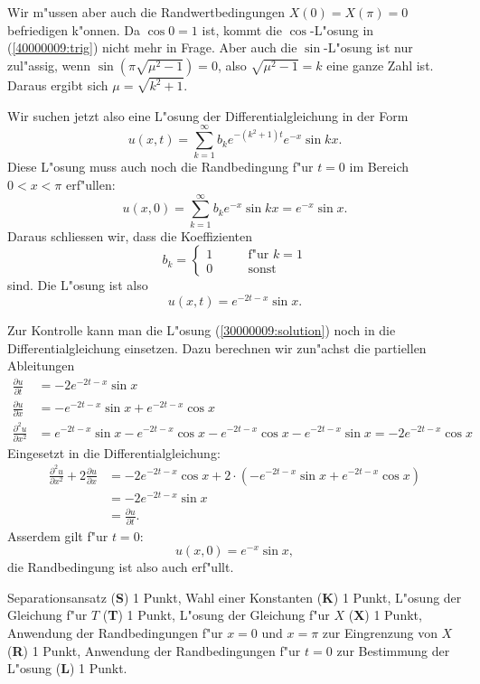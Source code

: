 \begin{loesung}
Wir m"ussen aber auch die Randwertbedingungen
$X(0)=X(\pi)=0$
befriedigen k"onnen.
Da $\cos 0=1$ ist, kommt die $\cos$-L"osung
in (\ref{40000009:trig}) nicht mehr in Frage.
Aber auch die $\sin$-L"osung ist nur
zul"assig, wenn $\sin(\pi\sqrt{\mu^2-1})=0$, also
$\sqrt{\mu^2-1}=k$ eine ganze Zahl ist.
Daraus ergibt sich $\mu=\sqrt{k^2+1}$.

Wir suchen jetzt also eine
L"osung der Differentialgleichung in der Form
\[
u(x,t)=\sum_{k=1}^\infty b_ke^{-(k^2+1)t}e^{-x}\sin kx.
\]
Diese L"osung muss auch noch die Randbedingung f"ur $t=0$ im
Bereich $0<x<\pi$ erf"ullen:
\[
u(x,0)=\sum_{k=1}^\infty b_ke^{-x}\sin kx=e^{-x}\sin x.
\]
Daraus schliessen wir, dass die Koeffizienten
\[
b_k=\begin{cases}
1&\qquad\text{f"ur $k=1$}\\
0&\qquad\text{sonst}
\end{cases}
\]
sind. Die L"osung ist also
\begin{equation}
u(x,t)=
e^{-2t-x}\sin x.
\label{30000009:solution}
\end{equation}
\end{loesung}

\begin{diskussion}
Zur Kontrolle kann man die L"osung (\ref{30000009:solution})
noch in die Differentialgleichung einsetzen.
Dazu berechnen wir zun"achst die partiellen Ableitungen
\begin{align*}
\frac{\partial u}{\partial t}
&=
-2 e^{-2t-x}\sin x
\\
\frac{\partial u}{\partial x}
&=
- e^{-2t-x}\sin x + 
e^{-2t-x}\cos x
\\
\frac{\partial^2 u}{\partial x^2}
&=
e^{-2t-x}\sin x 
- e^{-2t-x}\cos x 
-e^{-2t-x}\cos x
-e^{-2t-x}\sin x
=
-2 e^{-2t-x}\cos x
\end{align*}
Eingesetzt in die Differentialgleichung:
\begin{align*}
\frac{\partial^2 u}{\partial x^2}+2\frac{\partial u}{\partial x}
&=
-2 e^{-2t-x}\cos x
+
2\cdot(
- e^{-2t-x}\sin x + 
e^{-2t-x}\cos x
)
\\
&=
-2 e^{-2t-x}\sin x 
\\
&=\frac{\partial u}{\partial t}.
\end{align*}
Asserdem gilt f"ur $t=0$:
\[
u(x,0)=e^{-x}\sin x,
\]
die Randbedingung ist also auch erf"ullt.
\end{diskussion}

\begin{bewertung}
Separationsansatz ({\bf S}) 1 Punkt,
Wahl einer Konstanten ({\bf K}) 1 Punkt,
L"osung der Gleichung f"ur $T$ ({\bf T}) 1 Punkt,
L"osung der Gleichung f"ur $X$ ({\bf X}) 1 Punkt,
Anwendung der Randbedingungen f"ur $x=0$ und $x=\pi$
zur Eingrenzung von $X$ ({\bf R}) 1 Punkt,
Anwendung der Randbedingungen f"ur $t=0$ zur Bestimmung 
der L"osung ({\bf L}) 1 Punkt.
\end{bewertung}

